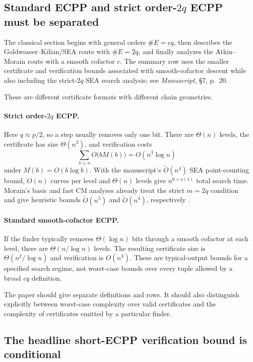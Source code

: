 \documentclass[11pt]{amsart}
\newcommand{\Ot}{\widetilde O}
\newcommand{\sourceat}[2]{\emph{Manuscript}, \S#1, p.~#2}
\begin{document}
\subsection{Standard ECPP and strict order-\texorpdfstring{$2q$}{2q} ECPP must be separated}
\label{sec:ecppsplit}

The classical section begins with general orders $\#E=cq$, then describes the Goldwasser--Kilian/SEA route with $\#E=2q$, and finally analyzes the Atkin--Morain route with a smooth cofactor $c$.  The summary row uses the smaller certificate and verification bounds associated with smooth-cofactor descent while also including the strict-$2q$ SEA search analysis; see \sourceat{7}{20}.

These are different certificate formats with different chain geometries.

\paragraph{Strict order-$2q$ ECPP.}
Here $q\approx p/2$, so a step usually removes only one bit.  There are $\Theta(n)$ levels, the certificate has size $\Theta(n^2)$, and verification costs
\[
 \sum_{b\le n} O\bigl(bM(b)\bigr)
 = O(n^3\log n)
\]
under $M(b)=O(b\log b)$.  With the manuscript's $\Ot(n^4)$ SEA point-counting bound, $O(n)$ curves per level and $\Theta(n)$ levels give $n^{6+o(1)}$ total search time.  Morain's basic and fast CM analyses already treat the strict $m=2q$ condition and give heuristic bounds $\Ot(n^5)$ and $\Ot(n^4)$, respectively \cite{Morain2007}.

\paragraph{Standard smooth-cofactor ECPP.}
If the finder typically removes $\Theta(\log n)$ bits through a smooth cofactor at each level, there are $\Theta(n/\log n)$ levels.  The resulting certificate size is $\Theta(n^2/\log n)$ and verification is $O(n^3)$.  These are typical-output bounds for a specified search regime, not worst-case bounds over every tuple allowed by a broad $cq$ definition.

The paper should give separate definitions and rows.  It should also distinguish explicitly between worst-case complexity over valid certificates and the complexity of certificates emitted by a particular finder.

\subsection{The headline short-ECPP verification bound is conditional}
\end{document}
